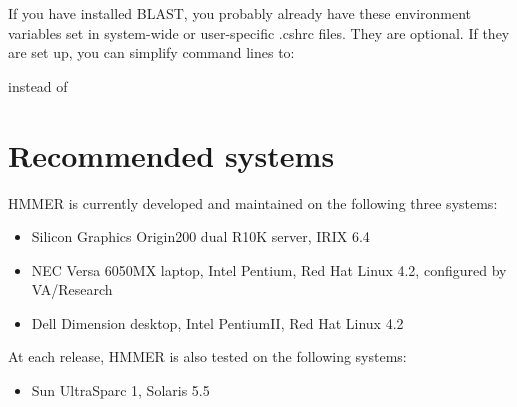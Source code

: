 If you have installed BLAST, you probably already have these 
environment variables set in system-wide or user-specific
.cshrc files. They are optional. If they are set up, you
can simplify command lines to:

\vspace{1.5em}

instead of

\vspace{1.5em}

\section{Recommended systems}

HMMER is currently developed and maintained on the following three
systems:

\begin{itemize}
\item Silicon Graphics Origin200 dual R10K server, IRIX 6.4
\item NEC Versa 6050MX laptop, Intel Pentium, 
      Red Hat Linux 4.2, configured by VA/Research
\item Dell Dimension desktop, Intel PentiumII, Red Hat
      Linux 4.2
\end{itemize}

At each release, HMMER is also tested on the following systems:

\begin{itemize}
\item Sun UltraSparc 1, Solaris 5.5
\end{itemize}


